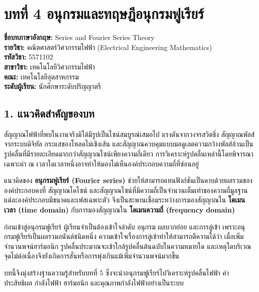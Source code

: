 \section{บทที่ 4 อนุกรมและทฤษฎีอนุกรมฟูเรียร์}

\textbf{ชื่อบทภาษาอังกฤษ:} Series and Fourier Series Theory\\
\textbf{รายวิชา:} คณิตศาสตร์วิศวกรรมไฟฟ้า (Electrical Engineering Mathematics)\\
\textbf{รหัสวิชา:} 5571102\\
\textbf{สาขาวิชา:} เทคโนโลยีวิศวกรรมไฟฟ้า\\
\textbf{คณะ:} เทคโนโลยีอุตสาหกรรม\\
\textbf{ระดับผู้เรียน:} นักศึกษาระดับปริญญาตรี


\subsection{1. แนวคิดสำคัญของบท}

สัญญาณไฟฟ้าที่พบในงานจริงมิได้มีรูปเป็นไซน์สมบูรณ์เสมอไป แรงดันจากวงจรสวิตชิ่ง สัญญาณพัลส์จากระบบดิจิทัล กระแสของโหลดไม่เชิงเส้น และสัญญาณควบคุมแบบมอดูเลตความกว้างพัลส์ล้วนเป็นรูปคลื่นที่มีรายละเอียดมากกว่าสัญญาณไซน์เพียงความถี่เดียว การวิเคราะห์รูปคลื่นเหล่านี้โดยพิจารณาเฉพาะค่า ณ เวลาใดเวลาหนึ่งอาจทำให้มองไม่เห็นองค์ประกอบความถี่ที่ซ่อนอยู่

แนวคิดของ \textbf{อนุกรมฟูเรียร์ (Fourier series)} ช่วยให้สามารถแทนฟังก์ชันเป็นคาบด้วยผลรวมขององค์ประกอบคงที่ สัญญาณโคไซน์ และสัญญาณไซน์ที่มีความถี่เป็นจำนวนเต็มเท่าของความถี่มูลฐาน แต่ละองค์ประกอบมีขนาดและเฟสเฉพาะตัว จึงเป็นสะพานเชื่อมระหว่างการมองสัญญาณใน \textbf{โดเมนเวลา (time domain)} กับการมองสัญญาณใน \textbf{โดเมนความถี่ (frequency domain)}

ก่อนเข้าสู่อนุกรมฟูเรียร์ ผู้เรียนจำเป็นต้องเข้าใจลำดับ อนุกรม ผลบวกย่อย และการลู่เข้า เพราะอนุกรมฟูเรียร์เป็นผลรวมอนันต์ชนิดหนึ่ง ความเข้าใจเรื่องการลู่เข้าทำให้สามารถตีความได้ว่า เมื่อเพิ่มจำนวนพจน์ฮาร์มอนิก รูปคลื่นประมาณจะเข้าใกล้รูปคลื่นต้นฉบับในความหมายใด และเหตุใดบริเวณจุดไม่ต่อเนื่องจึงยังเกิดการสั่นหรือการพุ่งเกินแม้เพิ่มจำนวนพจน์มากขึ้น

บทนี้จึงมุ่งสร้างฐานความรู้สำหรับบทที่ 5 ซึ่งจะนำอนุกรมฟูเรียร์ไปวิเคราะห์รูปคลื่นไฟฟ้า ค่าประสิทธิผล กำลังไฟฟ้า ฮาร์มอนิก และคุณภาพกำลังไฟฟ้าอย่างเป็นระบบ


